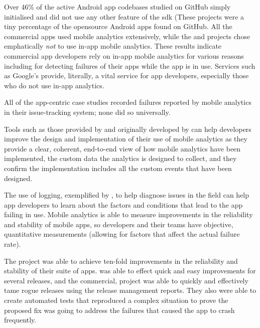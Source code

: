 Over 46\% of the active Android app codebases studied on GitHub simply initialised  and did not use any other feature of the \Gls{sdk} (These projects were a tiny percentage of the opensource Android apps found on GitHub. All the commercial apps used mobile analytics extensively, while the  and  projects chose emphatically \emph{not} to use in-app mobile analytics. These results indicate commercial app developers rely on in-app mobile analytics for various reasons including for detecting failures of their apps while the app is in use. Services such as Google's  provide, literally, a vital service for app developers, especially those who do not use in-app analytics.

All of the app-centric case studies recorded failures reported by mobile analytics in their issue-tracking system; none did so universally.


Tools such as those provided by  and originally developed by  can help developers improve the design and implementation of their use of mobile analytics as they provide a clear, coherent, end-to-end view of how mobile analytics have been implemented, the custom data the analytics is designed to collect, and they confirm the implementation includes all the custom events that have been designed.

The use of logging, exemplified by , to help diagnose issues in the field can help app developers to learn about the factors and conditions that lead to the app failing in use. Mobile analytics is able to measure improvements in the reliability and stability of mobile apps, so developers and their teams have objective, quantitative measurements (allowing for factors that affect the actual failure rate).

The  project was able to achieve ten-fold improvements in the reliability and stability of their suite of apps.  was able to effect quick and easy improvements for several releases, and the commercial,  project was able to quickly and effectively tame rogue releases using the release management reports. They also were able to create automated tests that reproduced a complex situation to prove the proposed fix was going to address the failures that caused the app to crash frequently.

